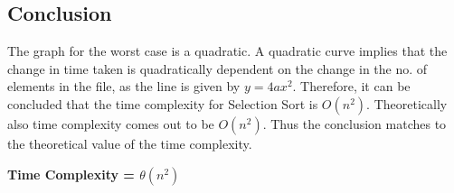 \documentclass{article}
\begin{document}
\subsection{Conclusion}
The graph for the worst case is a quadratic. A quadratic curve implies that
the change in time taken is quadratically dependent on the change in the no. of elements in the file,
as the line is given by $y = 4ax^2$.
Therefore, it can be concluded that the time complexity for Selection Sort is $O(n^2)$.
Theoretically also time complexity comes out to be $O(n^2)$. Thus the conclusion matches to the theoretical
value of the time complexity.

\textbf{Time Complexity = $\theta(n^2)$}
\end{document}
